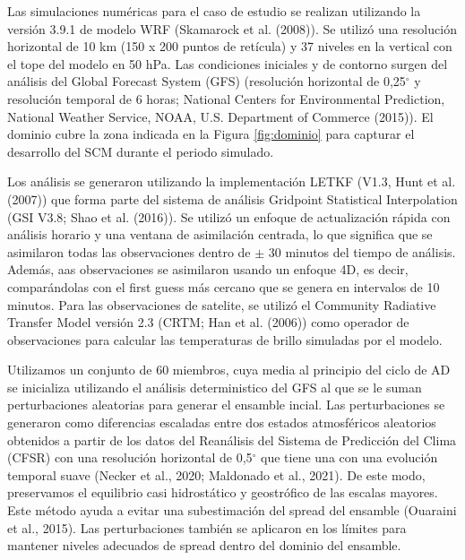 \documentclass[12pt,twoside]{reedthesis}
\begin{document}
Las simulaciones numéricas para el caso de estudio se realizan utilizando la versión 3.9.1 de modelo WRF (Skamarock et al. (2008)).
Se utilizó una resolución horizontal de 10 km (150 x 200 puntos de retícula) y 37 niveles en la vertical con el tope del modelo en 50 hPa.
Las condiciones iniciales y de contorno surgen del análisis del Global Forecast System (GFS) (resolución horizontal de 0,25\(^{\circ}\) y resolución temporal de 6 horas; National Centers for Environmental Prediction, National Weather Service, NOAA, U.S. Department of Commerce (2015)).
El dominio cubre la zona indicada en la Figura \ref{fig:dominio} para capturar el desarrollo del SCM durante el periodo simulado.

Los análisis se generaron utilizando la implementación LETKF (V1.3, Hunt et al. (2007)) que forma parte del sistema de análisis Gridpoint Statistical Interpolation (GSI V3.8; Shao et al. (2016)).
Se utilizó un enfoque de actualización rápida con análisis horario y una ventana de asimilación centrada, lo que significa que se asimilaron todas las observaciones dentro de \(\pm\) 30 minutos del tiempo de análisis.
Además, aas observaciones se asimilaron usando un enfoque 4D, es decir, comparándolas con el first guess más cercano que se genera en intervalos de 10 minutos.
Para las observaciones de satelite, se utilizó el Community Radiative Transfer Model versión 2.3 (CRTM; Han et al. (2006)) como operador de observaciones para calcular las temperaturas de brillo simuladas por el modelo.

Utilizamos un conjunto de 60 miembros, cuya media al principio del ciclo de AD se inicializa utilizando el análisis deterministico del GFS al que se le suman perturbaciones aleatorias para generar el ensamble incial. Las perturbaciones se generaron como diferencias escaladas entre dos estados atmosféricos aleatorios obtenidos a partir de los datos del Reanálisis del Sistema de Predicción del Clima (CFSR) con una resolución horizontal de 0,5\(^{\circ}\) que tiene una con una evolución temporal suave (Necker et al., 2020; Maldonado et al., 2021). De este modo, preservamos el equilibrio casi hidrostático y geostrófico de las escalas mayores. Este método ayuda a evitar una subestimación del spread del ensamble (Ouaraini et al., 2015). Las perturbaciones también se aplicaron en los límites para mantener niveles adecuados de spread dentro del dominio del ensamble.
\end{document}
